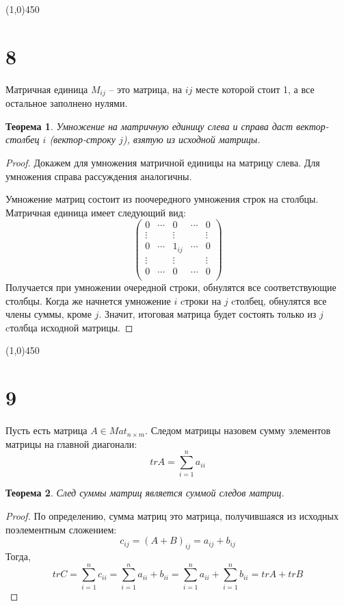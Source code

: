 \documentclass[a4paper,12pt]{article}
\newtheorem*{ther}{Теорема}
\begin{document}
	\begin{center}
		\line(1,0){450}
	\end{center}
	
	
	\section*{8}
	Матричная единица $M_{ij}$ -- это матрица, на $ij$ месте которой стоит 1, а все остальное заполнено нулями.
	
	\begin{ther}
		Умножение на матричную единицу слева и справа даст вектор-столбец $i$  (вектор-строку $j$), взятую из исходной матрицы.
	\end{ther}
	
	\begin{proof}
		Докажем для умножения матричной единицы на матрицу слева. Для умножения справа рассуждения аналогичны.
		
		Умножение матриц состоит из поочередного умножения строк на столбцы. Матричная единица имеет следующий вид:
		\[
		\begin{pmatrix}
		0		&\cdots	& 0 	& \cdots & 0 \\
		\vdots	&		& \vdots& 		 & \vdots \\
		0 		& \cdots& 1_{ij}& \cdots & 0 \\
		\vdots	&		& \vdots& 		 & \vdots \\
		0		&\cdots	& 0 	& \cdots & 0 \\
		\end{pmatrix}
		\]
		Получается при умножении очередной строки, обнулятся все соответствующие столбцы. Когда же начнется умножение $i$ cтроки на $j$ cтолбец, обнулятся все члены суммы, кроме $j$. Значит, итоговая матрица будет состоять только из $j$ cтолбца исходной матрицы.
	\end{proof}
	
	\begin{center}
		\line(1,0){450}
	\end{center}	

	\section*{9}
	Пусть есть матрица $A \in Mat_{n \times m}$. Следом матрицы назовем сумму элементов матрицы на главной диагонали:
	\[
	trA = \sum_{i = 1}^{n}a_{ii}
	\]
 
	\begin{ther}
		След суммы матриц является суммой следов матриц. 
	\end{ther}
	\begin{proof}
		По определению, сумма матриц это матрица, получившаяся из исходных поэлементным сложением:
		\[
		c_{ij} = (A + B)_{ij} = a_{ij} + b_{ij}
		\]
		Тогда,
		\[
		trC = \sum_{i = 1}^{n}c_{ii} = \sum_{i = 1}^{n} a_{ii} + b_{ii} = \sum_{i = 1}^{n} a_{ii} + \sum_{i = 1}^{n} b_{ii} = trA + trB
		\]
	\end{proof}
\end{document}

